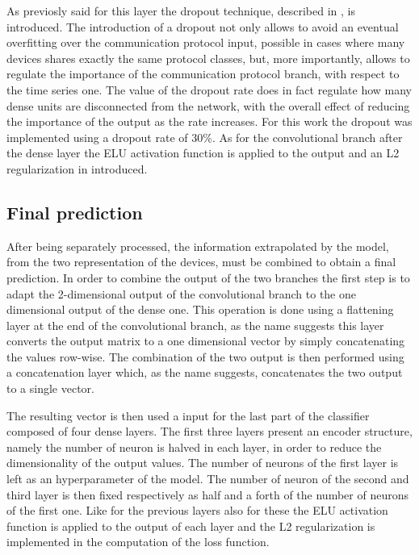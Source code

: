 As previosly said for this layer the dropout technique, described in , is introduced. The introduction of a dropout not only allows to avoid an eventual overfitting over the communication protocol input, possible in cases where many devices shares exactly the same protocol classes, but, more importantly, allows to regulate the importance of the communication protocol branch, with respect to the time series one. The value of the dropout rate does in fact regulate how many dense units are disconnected from the network, with the overall effect of reducing the importance of the output as the rate increases.
For this work the dropout was implemented using a dropout rate of 30\%.
As for the convolutional branch after the dense layer the ELU activation function is applied to the output and an L2 regularization in introduced.

\subsection{Final prediction}

After being separately processed, the information extrapolated by the model, from the two representation of the devices, must be combined to obtain a final prediction. 
In order to combine the output of the two branches the first step is to adapt the 2-dimensional output of the convolutional branch to the one dimensional output of the dense one. This operation is done using a flattening layer at the end of the convolutional branch, as the name suggests this layer converts the output matrix to a one dimensional vector by simply concatenating the values row-wise.
The combination of the two output is then performed using a concatenation layer which, as the name suggests, concatenates the two output to a single vector.

The resulting vector is then used a input for the last part of the classifier composed of four dense layers. The first three layers present an encoder structure, namely the number of neuron is halved in each layer, in order to reduce the dimensionality of the output values. The number of neurons of the first layer is left as an hyperparameter of the model. The number of neuron of the second and third layer is then fixed respectively as half and a forth of the number of neurons of the first one. Like for the previous layers also for these the ELU activation function is applied to the output of each layer and the L2 regularization is implemented in the computation of the loss function.


